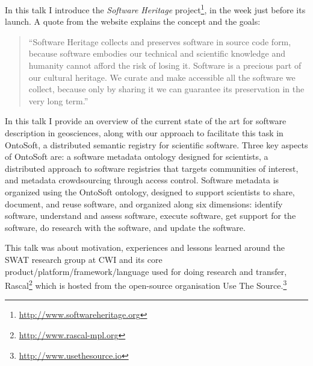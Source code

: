 \documentclass[a4paper,UKenglish]{dagrep}
\begin{document}

 In this talk I introduce the \emph{Software Heritage} project\footnote{\url{http://www.softwareheritage.org}}, in the week just before its launch.  
A quote from the website explains the concept and the goals:
\begin{quote}
``Software Heritage collects and preserves software in source code form, because software embodies our technical and scientific knowledge and humanity cannot afford the risk of losing it.
Software is a precious part of our cultural heritage. We curate and make accessible all the software we collect, because only by sharing it we can guarantee its preservation in the very long term.''
\end{quote}


In this talk I provide an overview of the current state of the art for software description in geosciences, along with our approach to facilitate this task in OntoSoft, a distributed semantic registry for scientific software. Three key aspects of OntoSoft are: a software metadata ontology designed for scientists, a distributed approach to software registries that targets communities of interest, and metadata crowdsourcing through access control. Software metadata is organized using the OntoSoft ontology, designed to support scientists to share, document, and reuse software, and organized along six dimensions: identify software, understand and assess software, execute software, get support for the software, do research with the software, and update the software.


This talk was about motivation, experiences and lessons learned around the SWAT research group at CWI and its core product/platform/framework/language used for doing research and transfer, Rascal\footnote{\url{http://www.rascal-mpl.org}} which is hosted from the open-source organisation Use The Source.\footnote{\url{http://www.usethesource.io}}

\end{document}
